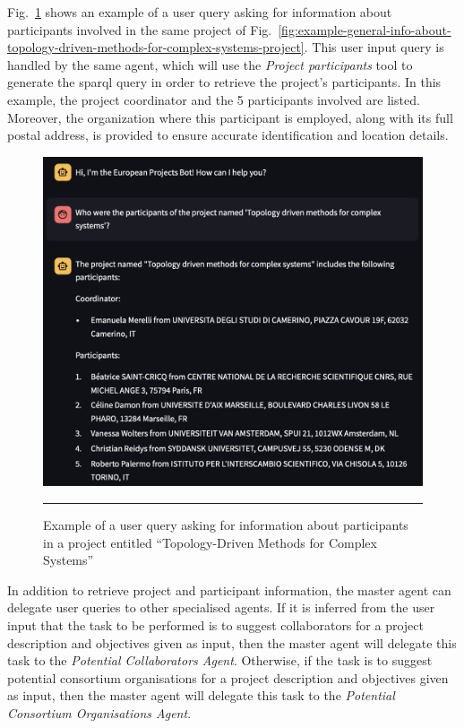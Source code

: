 Fig.~\ref{fig:example-participants-of-topology-driven-methods-for-complex-systems-project} shows an example of a user query asking for information about participants involved in the same project of Fig.~\ref{fig:example-general-info-about-topology-driven-methods-for-complex-systems-project}.
This user input query is handled by the same agent, which will use the \textit{Project participants} tool to generate the \gls{sparql} query in order to retrieve the project's participants.
In this example, the project coordinator and the 5 participants involved are listed.
Moreover, the organization where this participant is employed, along with its full postal address, is provided to ensure accurate identification and location details.

\begin{figure}[htbp]
    \centering
 \includegraphics[width=.75\textwidth]{figures/implementation/example-participants-of-topology-driven-methods-for-complex-systems-project.png}
     \rule{35em}{0.5pt}
    \caption{Example of a user query asking for information about participants in a project entitled ``Topology-Driven Methods for Complex Systems''}
 \label{fig:example-participants-of-topology-driven-methods-for-complex-systems-project}
\end{figure}

In addition to retrieve project and participant information, the master agent can delegate user queries to other specialised agents.
If it is inferred from the user input that the task to be performed is to suggest collaborators for a project description and objectives given as input, then the master agent will delegate this task to the \textit{Potential Collaborators Agent}.
Otherwise, if the task is to suggest potential consortium organisations for a project description and objectives given as input, then the master agent will delegate this task to the \textit{Potential Consortium Organisations Agent}.

